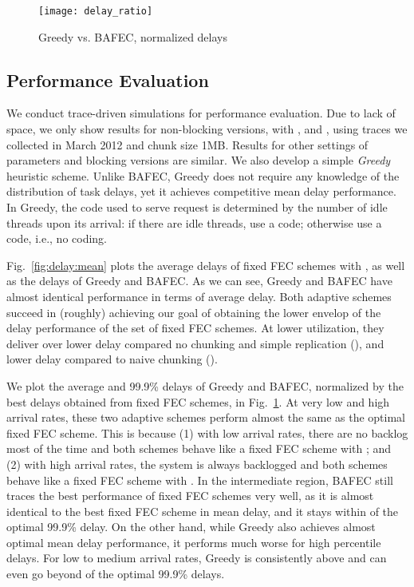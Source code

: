 \documentclass[journal]{IEEEtran}
\newcommand{\nonBlocking}{{BAFEC}\xspace}
\begin{document}
\begin{figure}[t]
\centering
\texttt{[image: delay\_ratio]}
\vspace{-10pt}
\caption{Greedy vs. \nonBlocking, normalized delays}
\label{fig:delay:ratio}
\vspace{-10pt}
\end{figure}

\subsection{Performance Evaluation}
We conduct trace-driven simulations for performance evaluation. Due to lack of space, we only show results for non-blocking versions, with ,  and , using traces we collected in March 2012 and chunk size 1MB. Results for other settings of parameters and blocking versions are similar.
We also develop a simple {\em Greedy} heuristic scheme. Unlike \nonBlocking, Greedy does not require any knowledge of the distribution of task delays, yet it achieves competitive mean delay performance. In Greedy, the code used to serve request  is determined by the number of idle threads upon its arrival: if there are  idle threads, use a  code; otherwise use a  code, i.e., no coding.

Fig.~\ref{fig:delay:mean} plots the average delays of fixed FEC schemes with , as well as the delays of  Greedy  and \nonBlocking. As we can see, Greedy and \nonBlocking have almost identical performance in terms of average delay. Both adaptive schemes succeed in (roughly) achieving our goal of obtaining the lower envelop of the delay performance of the set of fixed FEC schemes. At lower utilization, they deliver over  lower delay compared no chunking and simple  replication (), and  lower delay compared to naive chunking ().

We plot the average and 99.9\% delays of Greedy and \nonBlocking, normalized by the best delays obtained from fixed FEC schemes, in Fig.~\ref{fig:delay:ratio}. At very low and high arrival rates, these two adaptive schemes perform almost the same as the optimal fixed FEC scheme. This is because (1) with low arrival rates, there are no backlog most of the time and both schemes behave like a fixed FEC scheme with ; and (2) with high arrival rates, the system is always backlogged and both schemes behave like a fixed FEC scheme with . In the intermediate region, \nonBlocking still traces the best performance of fixed FEC schemes very well, as it is almost identical to the best fixed FEC scheme in mean delay, and it stays within   of the optimal 99.9\% delay. On the other hand, while Greedy also achieves almost optimal mean delay performance, it performs much worse for high percentile delays. For low to medium arrival rates, Greedy is consistently above  and can even go beyond  of the optimal 99.9\% delays. 
\end{document}
